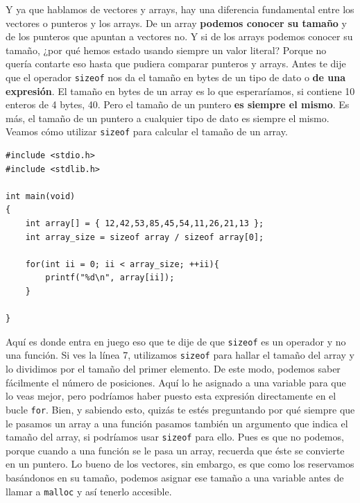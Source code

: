 \documentclass[a4paper]{article}
\begin{document}
Y ya que hablamos de vectores y arrays, hay una diferencia fundamental entre
los vectores o punteros y los arrays. De un array \textbf{podemos conocer su
tamaño} y de los punteros que apuntan a vectores no. Y si de los arrays podemos
conocer su tamaño, ¿por qué hemos estado usando siempre un valor literal? Porque
no quería contarte eso hasta que pudiera comparar punteros y arrays. Antes te
dije que el operador \verb!sizeof! nos da el tamaño en bytes de un tipo de dato
o \textbf{de una expresión}. El tamaño en bytes de un array es lo que
esperaríamos, si contiene 10 enteros de 4 bytes, 40. Pero el tamaño de un
puntero \textbf{es siempre el mismo}. Es más, el tamaño de un puntero a
cualquier tipo de dato es siempre el mismo. Veamos cómo utilizar \verb!sizeof!
para calcular el tamaño de un array.

\noindent
\begin{minipage}[H]{\linewidth}
\mbox{}
\begin{lstlisting}[style=C, label={lst:sizeofArraysPointers}, caption={Diferencia entre \texttt{sizeof} con punteros y arrays}]
#include <stdio.h>
#include <stdlib.h>

int main(void)
{
    int array[] = { 12,42,53,85,45,54,11,26,21,13 };
    int array_size = sizeof array / sizeof array[0];

    for(int ii = 0; ii < array_size; ++ii){
        printf("%d\n", array[ii]);
    }

}
\end{lstlisting}
\end{minipage}

Aquí es donde entra en juego eso que te dije de que \verb!sizeof! es un operador
y no una función. Si ves la línea 7, utilizamos \verb!sizeof! para hallar el
tamaño del array y lo dividimos por el tamaño del primer elemento. De este
modo, podemos saber fácilmente el número de posiciones. Aquí lo he asignado
a una variable para que lo veas mejor, pero podríamos haber puesto esta
expresión directamente en el bucle \verb!for!. Bien, y sabiendo esto, quizás
te estés preguntando por qué siempre que le pasamos un array a una función
pasamos también un argumento que indica el tamaño del array, si podríamos usar
\verb!sizeof! para ello. Pues es que no podemos, porque cuando a una función se
le pasa un array, recuerda que éste se convierte en un puntero. Lo bueno de los
vectores, sin embargo, es que como los reservamos basándonos en su tamaño,
podemos asignar ese tamaño a una variable antes de llamar a \verb!malloc! y
así tenerlo accesible.
\end{document}
